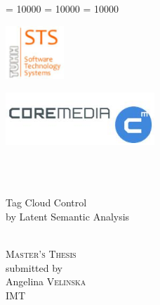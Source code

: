 \documentclass[12pt,a4paper]{extreport}
\begin{document}
\clubpenalty = 10000
\widowpenalty = 10000 
\displaywidowpenalty = 10000

\newenvironment{summary}{\begin{quotation}\it\textbf{Summary.\space}}{\end{quotation}\vspace{0.3cm}}
\begin{titlepage}


\begin{minipage}{1\linewidth}
\begin{flushright}
\begin{minipage}[h]{0.4\linewidth}
\includegraphics[height=2cm]{img/STSlogo}
\end{minipage}
\hspace{0.5cm}
\begin{minipage}[h]{0.4\linewidth}
\includegraphics[height=2cm]{img/CoremediaLogo}
\end{minipage}\\
\bigskip
\Huge
\hrulefill\\
\bigskip
\begin{center}
Tag Cloud Control \\
by Latent Semantic Analysis\\
\end{center}
\hrulefill\\ 
\bigskip 
\bigskip
\large \textsc{Master's Thesis}\\
\medskip
\normalsize submitted by\\
\large
Angelina \textsc{Velinska}\\
\normalsize IMT\\
\end{flushright}
\end{minipage}

\vspace{2.5cm}

\begin{minipage}[b]{1\linewidth}
\begin{flushleft}


\end{flushleft}
\end{minipage}
\end{titlepage}
\end{document}
